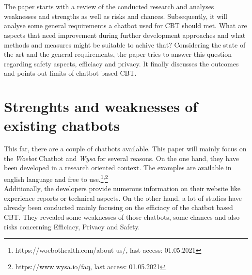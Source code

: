 \documentclass[sigconf, nonacm]{acmart}
\begin{document}
\\\\
The paper starts with a review of the conducted research and analyses weaknesses and strengths as well as risks and chances. 
Subsequently, it will analyse some general requirements a chatbot used for CBT should met.
What are aspects that need improvement during further development approaches and what methods and measures might be suitable to achive that? 
Considering the state of the art and the general requirements, the paper tries to answer this question regarding safety aspects, efficiacy and privacy.
It finally discusses the outcomes and points out limits of chatbot based CBT.



\section{Strenghts and weaknesses of existing chatbots}
This far, there are a couple of chatbots available. This paper will mainly focus on the \emph{Woebot} Chatbot and \emph{Wysa} for several reasons.
On the one hand, they have been developed in a research oriented context. 
The examples are available in english language and free to use.\footnote{https://woebothealth.com/about-us/, last access: 01.05.2021}\textsuperscript{,}\footnote{https://www.wysa.io/faq, last access: 01.05.2021}
\\
Additionally, the developers provide numerous information on their website
like experience reports or technical aspects.
On the other hand, a lot of studies have already been conducted mainly focusing on the efficiacy of the chatbot based CBT. 
They revealed some weaknesses of those chatbots, some chances and also risks concerning Efficiacy, Privacy and Safety.
\end{document}
